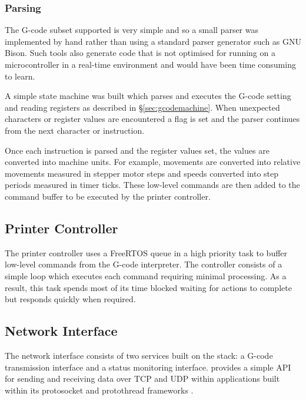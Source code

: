 			\subsubsection{Parsing}
				
				The G-code subset supported is very simple and so a small parser was
				implemented by hand rather than using a standard parser generator such
				as GNU Bison. Such tools also generate code that is not optimised for
				running on a microcontroller in a real-time environment and would have
				been time consuming to learn.
				
				A simple state machine was built which parses and executes the G-code
				setting and reading registers as described in \S\ref{sec:gcodemachine}.
				When unexpected characters or register values are encountered a flag is
				set and the parser continues from the next character or instruction.
				
				Once each instruction is parsed and the register values set, the values
				are converted into machine units. For example, movements are converted
				into relative movements measured in stepper motor steps and speeds
				converted into step periods measured in timer ticks. These low-level
				commands are then added to the command buffer to be executed by the
				printer controller.
		
		\subsection{Printer Controller}
			
			The printer controller uses a FreeRTOS queue in a high priority task to
			buffer low-level commands from the G-code interpreter. The controller
			consists of a simple loop which executes each command requiring minimal
			processing. As a result, this task spends most of its time blocked waiting
			for actions to complete but responds quickly when required.
		
		\subsection{Network Interface}
			
			The network interface consists of two services built on the \uIP{} stack:
			a G-code transmission interface and a status monitoring interface. \uIP{}
			provides a simple API for sending and receiving data over TCP and UDP
			within applications built within its protosocket and protothread
			frameworks \cite{uIP}.
			
